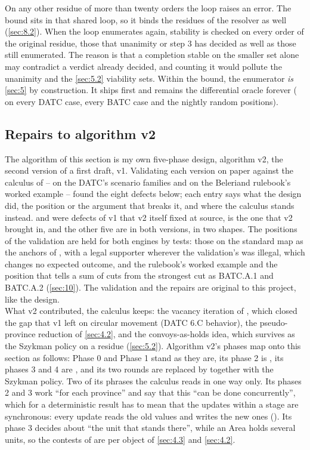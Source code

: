 \documentclass[12pt,a4paper]{article}
\begin{document}
On any other residue of more than twenty orders the loop raises an error.
The bound sits in that shared loop, so it binds the residues of the resolver as well (\cref{sec:8.2}).
When the loop enumerates again, stability is checked on every order of the original residue, those that unanimity or step 3 has decided as well as those still enumerated.
The reason is that a completion stable on the smaller set alone may contradict a verdict already decided, and counting it would pollute the unanimity and the \cref{sec:5.2} viability sets.
Within the bound, the enumerator \emph{is} \cref{sec:5} by construction.
It ships first and remains the differential oracle forever ( on every DATC case, every BATC case and the nightly random positions).

\subsection*{Repairs to algorithm v2}\label{sec:6.repairs}

The algorithm of this section is my own five-phase design, algorithm v2, the second version of a first draft, v1.
Validating each version on paper against the calculus of  -- on the DATC's scenario families and on the Beleriand rulebook's worked example -- found the eight defects below; each entry says what the design did, the position or the argument that breaks it, and where the calculus stands instead.
 and  were defects of v1 that v2 itself fixed at source,  is the one that v2 brought in, and the other five are in both versions,  in two shapes.
The positions of the validation are held for both engines by tests: those on the standard map as the anchors of , with a legal supporter wherever the validation's was illegal, which changes no expected outcome, and the rulebook's worked example and the position that tells a sum of cuts from the strongest cut as BATC.A.1 and BATC.A.2 (\cref{sec:10}).
The validation and the repairs are original to this project, like the design.\\
What v2 contributed, the calculus keeps: the vacancy iteration of , which closed the gap that v1 left on circular movement (DATC 6.C behavior), the pseudo-province reduction of \cref{sec:4.2}, and the convoys-as-holds idea, which survives as the Szykman policy on a residue (\cref{sec:5.2}).
Algorithm v2's phases map onto this section as follows: Phase 0 and Phase 1 stand as they are, its phase 2 is , its phases 3 and 4 are , and its two rounds are replaced by  together with the Szykman policy.
Two of its phrases the calculus reads in one way only.
Its phases 2 and 3 work ``for each province'' and say that this ``can be done concurrently'', which for a deterministic result has to mean that the updates within a stage are synchronous: every update reads the old values and writes the new ones ().
Its phase 3 decides about ``the unit that stands there'', while an Area holds several units, so the contests of  are per object of \cref{sec:4.3} and \cref{sec:4.2}.
\end{document}
